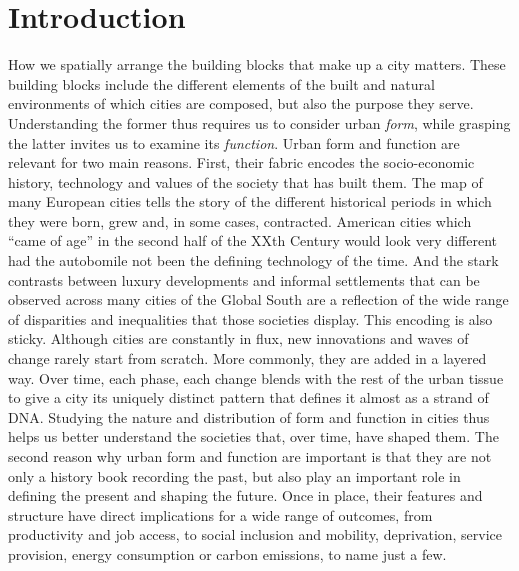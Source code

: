 \section{Introduction}
\label{sec:intro}

How we spatially arrange the building blocks that make up a city matters.
These building blocks include the different
elements of the built and natural environments of which cities are composed,
but also the purpose they serve.
Understanding the former thus requires us to consider urban \textit{form}, while
grasping the latter invites us to examine its \textit{function}.
Urban form and function are relevant for two main reasons. First, their fabric
encodes the socio-economic history, technology and values
of the society that has built them.
%
The map of many European cities tells the story of the different historical
periods in which they were born, grew and, in some cases, contracted.
%
American cities which ``came of age'' in the second half of the XXth Century
would look very different had the autobomile not been the defining
technology of the time.
%
And the stark contrasts between luxury developments and informal settlements
that can be observed across many cities of the Global South are a reflection
of the wide range of disparities and inequalities that those societies
display.
%
This encoding is also sticky. Although cities are constantly in flux, new
innovations and waves of change rarely start from scratch. More commonly, they
are added in a layered way. Over time, each phase, each change blends with the rest
of the urban tissue to give a city its uniquely distinct pattern that defines
it almost as a strand of DNA.
%
Studying the nature and distribution
of form and function in cities thus helps us better understand the societies
that, over time, have shaped them.
The second reason why urban form and function are important is that they are
not only a history book recording the past, but also play an important role in
defining the present and shaping the future.
%
Once in place, their features and structure have direct implications for a
wide range of outcomes, from  productivity and job access, to social inclusion
and mobility, deprivation, service provision, energy consumption or carbon
emissions, to name just a few.


